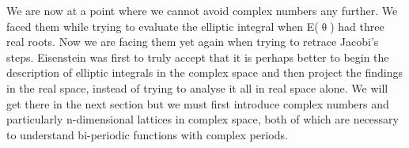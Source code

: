 \documentclass[a4paper,10pt]{article}
\begin{document}
\begin{flushleft}
{{	We are now at a point where we cannot avoid complex numbers any further. We faced them while trying to evaluate the elliptic integral when {E($\uptheta$)} had three real roots. Now we are facing them yet again when trying to retrace Jacobi's steps. Eisenstein was first to truly accept that it is perhaps better to begin the description of elliptic integrals in the complex space and then project the findings in the real space, instead of trying to analyse it all in real space alone. We will get there in the next section but we must first introduce complex numbers and particularly n-dimensional lattices in complex space, both of which are necessary to understand bi-periodic functions with complex periods.
	\linebreak\linebreak\linebreak
	}}
	\textbf{\Large{}}\linebreak\linebreak
	\textls[-50]{\mono{-
	}}
\end{flushleft}
\begin{flushleft}
	\textbf{\Large{}}\linebreak\linebreak
\end{flushleft}
\begin{flushright}
	\textbf{\large{}}\linebreak\linebreak
\end{flushright}
\end{document}

